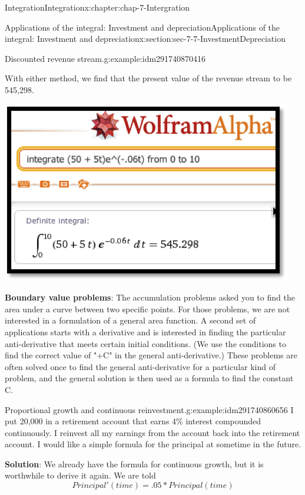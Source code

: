 \documentclass[oneside,10pt,]{book}
\newcommand{\terminology}[1]{\textbf{#1}}
\numberwithin{equation}{section}
\begin{document}
\begin{chapterptx}{Integration}{}{Integration}{}{}{x:chapter:chap-7-Intergration}
\begin{sectionptx}{Applications of the integral: Investment and depreciation}{}{Applications of the integral: Investment and depreciation}{}{}{x:section:sec-7-7-InvestmentDepreciation}
\begin{example}{Discounted revenue stream.}{g:example:idm291740870416}
\par
With either method, we find that the present value of the revenue stream to be \textdollar{}545,298.%
\begin{sidebyside}{1}{0.25}{0.25}{0}%
\begin{sbspanel}{0.5}%
\includegraphics[width=\linewidth]{images/sec7-7-5.png}
\end{sbspanel}%
\end{sidebyside}%
\end{example}
\terminology{Boundary value problems}: The accumulation problems asked you to find the area under a curve between two specific points.  For those problems, we are not interested in a formulation of a general area function.  A second set of applications starts with a derivative and is interested in finding the particular anti-derivative that meets certain initial conditions.  (We use the conditions to find the correct value of "+C" in the general anti-derivative.)  These problems are often solved once to find the general anti-derivative for a particular kind of problem, and the general solution is then used as a formula to find the constant C.%
\begin{example}{Proportional growth and continuous reinvestment.}{g:example:idm291740860656}%
I put \textdollar{}20,000 in a retirement account that earns 4\% interest compounded continuously.  I reinvest all my earnings from the account back into the retirement account.   I would like a simple formula for the principal at sometime in the future.%
\par
\terminology{Solution}: We already have the formula for continuous growth, but it is worthwhile to derive it again.  We are told%
%
\begin{equation*}
Principal' (time)=.05*Principal(time)

\end{equation*}
\end{example}
\end{sectionptx}
\end{chapterptx}
\end{document}
